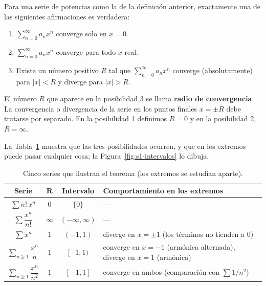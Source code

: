  \begin{theorem}
     Para una serie de potencias como la de la definición anterior, exactamente una de las siguientes afirmaciones es verdadera:
\begin{enumerate}
    \item $\sum_{n=0}^{\infty} a_n x^n$ converge solo en $x = 0$.
    \item $\sum_{n=0}^{\infty} a_n x^n$ converge para todo $x$ real.
    \item Existe un número positivo $R$ tal que $\sum_{n=0}^{\infty} a_n x^n$ converge (absolutamente) para $|x| < R$ y diverge para $|x| > R$.
\end{enumerate}
 \end{theorem}
 
 \begin{remark}
     El número $R$ que aparece en la posibilidad 3 se llama \textbf{radio de convergencia}. La convergencia o divergencia de la serie en los puntos finales $x = \pm R$ debe tratarse por separado. En la posibilidad 1 definimos $R=0$ y en la posibilidad 2, $R = \infty$.
 \end{remark}
 
La Tabla~\ref{tab:s1-tres-casos} muestra que las tres posibilidades ocurren, y que en los extremos puede pasar cualquier cosa; la Figura~\ref{fig:s1-intervalos} lo dibuja.
 
\begin{table}[H]
\centering
\small
\caption{Cinco series que ilustran el teorema (los extremos se estudian aparte).}
\label{tab:s1-tres-casos}
\begin{tabular}{|c|c|c|p{5.4cm}|}
\hline
\rowcolor{bbe!15}\textbf{Serie} & $\mathbf{R}$ & \textbf{Intervalo} & \textbf{Comportamiento en los extremos} \\ \hline
$\displaystyle\sum n!\,x^n$ & $0$ & $\{0\}$ & ---  \\ \hline
$\displaystyle\sum \dfrac{x^n}{n!}$ & $\infty$ & $(-\infty,\infty)$ & ---  \\ \hline
$\displaystyle\sum x^n$ & $1$ & $(-1,1)$ & diverge en $x=\pm 1$ (los términos no tienden a $0$) \\ \hline
$\displaystyle\sum_{n\ge 1} \dfrac{x^n}{n}$ & $1$ & $[-1,1)$ & converge en $x=-1$ (armónica alternada), diverge en $x=1$ (armónica) \\ \hline
$\displaystyle\sum_{n\ge 1} \dfrac{x^n}{n^2}$ & $1$ & $[-1,1]$ & converge en ambos (comparación con $\sum 1/n^2$) \\ \hline
\end{tabular}
\end{table}
 
